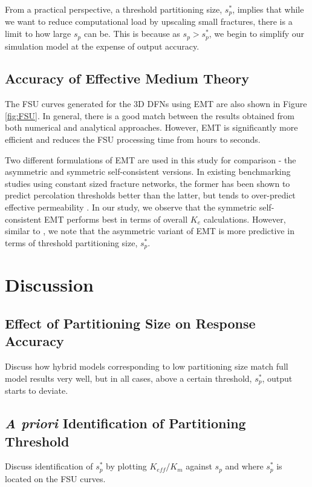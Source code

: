 \documentclass[a4paper]{article}
\begin{document}
From a practical perspective, a threshold partitioning size, $s_p^*$, implies that while we want to reduce computational load by upscaling small fractures, there is a limit to how large $s_p$ can be. This is because as $s_p>s_p^*$, we begin to simplify our simulation model at the expense of output accuracy.



\subsection{Accuracy of Effective Medium Theory}
The FSU curves generated for the 3D DFNs using EMT are also shown in Figure \ref{fig:FSU}. In general, there is a good match between the results obtained from both numerical and analytical approaches. However, EMT is significantly more efficient and reduces the FSU processing time from hours to seconds.

Two different formulations of EMT are used in this study for comparison - the asymmetric and symmetric self-consistent versions. In existing benchmarking studies using constant sized fracture networks, the former has been shown to predict percolation thresholds better than the latter, but tends to over-predict effective permeability \citep{Saevik2013, Saevik2014}. In our study, we observe that the symmetric self-consistent EMT performs best in terms of overall $K_e$ calculations. However, similar to \citet{Saevik2013}, we note that the asymmetric variant of EMT is more predictive in terms of threshold partitioning size, $s_p^*$.

\section{Discussion}
\subsection{Effect of Partitioning Size on Response Accuracy}
Discuss how hybrid models corresponding to low partitioning size match full model results very well, but in all cases, above a certain threshold, $s_p^*$, output starts to deviate.

\subsection{\textit{A priori} Identification of Partitioning Threshold}
Discuss identification of $s_p^*$ by plotting $K_{eff}/K_m$ against $s_p$ and where $s_p^*$ is located on the FSU curves.
\end{document}
